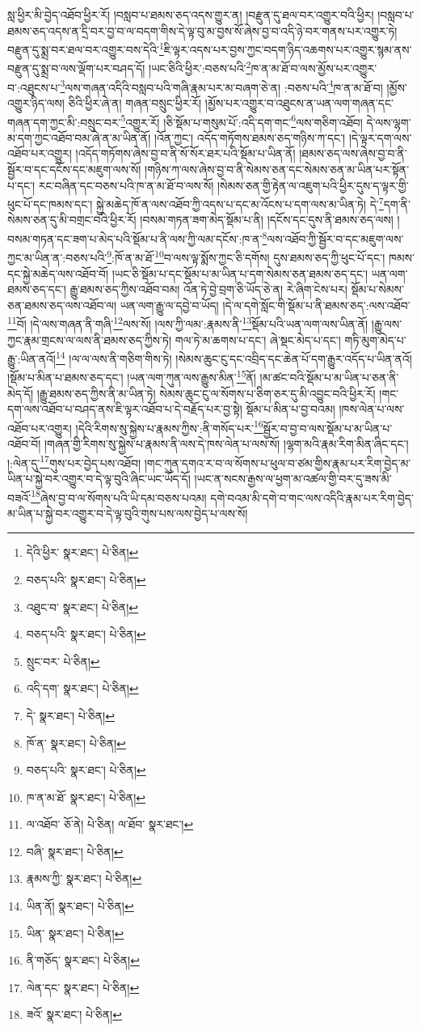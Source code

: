 སླ་ཕྱིར་མི་བྱེད་འཐོབ་ཕྱིར་རོ། །བསླབ་པ་ཐམས་ཅད་འདས་གྱུར་ན། །བརྫུན་དུ་ཐལ་བར་འགྱུར་བའི་ཕྱིར། །བསླབ་པ་ཐམས་ཅད་འདས་ན་དྲི་བར་བྱ་བ་ལ་བདག་གིས་དེ་ལྟ་བུ་མ་བྱས་སོ་ཞེས་བྱ་བ་འདི་ཉེ་བར་གནས་པར་འགྱུར་ཏེ། བརྫུན་དུ་སྨྲ་བར་ཐལ་བར་འགྱུར་བས་དེའི་\footnote{དེའི་ཕྱིར་  སྣར་ཐང་།  པེ་ཅིན། }ཇི་ལྟར་འདས་པར་བྱས་ཀྱང་བདག་ཉིད་འཆགས་པར་འགྱུར་སྙམ་ནས་བརྫུན་དུ་སྨྲ་བ་ལས་ལྡོག་པར་བཤད་དོ། །ཡང་ཅིའི་ཕྱིར་:བཅས་པའི་\footnote{བཅད་པའི་  སྣར་ཐང་།  པེ་ཅིན། }ཁ་ན་མ་ཐོ་བ་ལས་མྱོས་པར་འགྱུར་བ་:འཐུངས་པ་\footnote{འཐུང་བ་  སྣར་ཐང་།  པེ་ཅིན། }ལས་གཞན་འདིའི་བསླབ་པའི་གཞི་རྣམ་པར་མ་བཞག་ཅེ་ན། :བཅས་པའི་\footnote{བཅད་པའི་  སྣར་ཐང་།  པེ་ཅིན། }ཁ་ན་མ་ཐོ་བ། །མྱོས་འགྱུར་ཉིད་ལས། ཅིའི་ཕྱིར་ཞེ་ན། གཞན་བསྲུང་ཕྱིར་རོ། །མྱོས་པར་འགྱུར་བ་འཐུངས་ན་ཡན་ལག་གཞན་དང་གཞན་དག་ཀྱང་མི་:བསྲུང་བར་\footnote{སྲུང་བར་  པེ་ཅིན། }འགྱུར་རོ། །ཅི་སྡོམ་པ་གསུམ་པོ་:འདི་དག་གང་\footnote{འདི་དག་  སྣར་ཐང་།  པེ་ཅིན། }ལས་གཅིག་འཐོབ། དེ་ལས་ལྷག་མ་དག་ཀྱང་འཐོབ་བམ་ཞེ་ན་མ་ཡིན་ནོ། །འོན་ཀྱང་། འདོད་གཏོགས་ཐམས་ཅད་གཉིས་ཀ་དང་། །དེ་ལྟར་དག་ལས་འཐོབ་པར་འགྱུར། །འདོད་གཏོགས་ཞེས་བྱ་བ་ནི་སོ་སོར་ཐར་པའི་སྡོམ་པ་ཡིན་ནོ། །ཐམས་ཅད་ལས་ཞེས་བྱ་བ་ནི་སྦྱོར་བ་དང་དངོས་དང་མཇུག་ལས་སོ། །གཉིས་ཀ་ལས་ཞེས་བྱ་བ་ནི་སེམས་ཅན་དང་སེམས་ཅན་མ་ཡིན་པར་སྟོན་པ་དང་། རང་བཞིན་དང་བཅས་པའི་ཁ་ན་མ་ཐོ་བ་ལས་སོ། །སེམས་ཅན་གྱི་རྟེན་ལ་འཇུག་པའི་ཕྱིར་དུས་ད་ལྟར་གྱི་ཕུང་པོ་དང་ཁམས་དང་། སྐྱེ་མཆེད་ཁོ་ན་ལས་འཐོབ་ཀྱི་འདས་པ་དང་མ་འོངས་པ་དག་ལས་མ་ཡིན་ཏེ། དེ་\footnote{དེ་  སྣར་ཐང་།  པེ་ཅིན། }དག་ནི་སེམས་ཅན་དུ་མི་བགྲང་བའི་ཕྱིར་རོ། །བསམ་གཏན་ཟག་མེད་སྡོམ་པ་ནི། །དངོས་དང་དུས་ནི་ཐམས་ཅད་ལས། །བསམ་གཏན་དང་ཟག་པ་མེད་པའི་སྡོམ་པ་ནི་ལས་ཀྱི་ལམ་དངོས་:ཁ་ན་\footnote{ཁོ་ན་  སྣར་ཐང་།  པེ་ཅིན། }ལས་འཐོབ་ཀྱི་སྦྱོར་བ་དང་མཇུག་ལས་ཀྱང་མ་ཡིན་ན་:བཅས་པའི་\footnote{བཅད་པའི་  སྣར་ཐང་།  པེ་ཅིན། }:ཁོ་ན་མ་ཐོ་\footnote{ཁ་ན་མ་ཐོ་  སྣར་ཐང་།  པེ་ཅིན། }བ་ལས་ལྟ་སྨོས་ཀྱང་ཅི་དགོས། དུས་ཐམས་ཅད་ཀྱི་ཕུང་པོ་དང་། ཁམས་དང་སྐྱེ་མཆེད་ལས་འཐོབ་བོ། །ཡང་ཅི་སྡོམ་པ་དང་སྡོམ་པ་མ་ཡིན་པ་དག་སེམས་ཅན་ཐམས་ཅད་དང་། ཡན་ལག་ཐམས་ཅད་དང་། རྒྱུ་ཐམས་ཅད་ཀྱིས་འཐོབ་བམ། འོན་ཏེ་བྱེ་བྲག་ཅི་ཡོད་ཅེ་ན། རེ་ཞིག་ངེས་པར། སྡོམ་པ་སེམས་ཅན་ཐམས་ཅད་ལས་འཐོབ་ལ། ཡན་ལག་རྒྱུ་ལ་དབྱེ་བ་ཡོད། །དེ་ལ་དགེ་སློང་གི་སྡོམ་པ་ནི་ཐམས་ཅད་:ལས་འཐོབ་\footnote{ལ་འཐོབ་  ཅོ་ནེ།  པེ་ཅིན། ལ་ཐོབ་  སྣར་ཐང་། }བོ། །དེ་ལས་གཞན་ནི་གཞི་\footnote{བཞི་  སྣར་ཐང་།  པེ་ཅིན། }ལས་སོ། །ལས་ཀྱི་ལམ་:རྣམས་ནི་\footnote{རྣམས་ཀྱི་  སྣར་ཐང་།  པེ་ཅིན། }སྡོམ་པའི་ཡན་ལག་ལས་ཡིན་ནོ། །རྒྱུ་ལས་ཀྱང་རྣམ་གྲངས་ལ་ལས་ནི་ཐམས་ཅད་ཀྱིས་ཏེ། གལ་ཏེ་མ་ཆགས་པ་དང་། ཞེ་སྡང་མེད་པ་དང་། གཏི་མུག་མེད་པ་རྒྱུ་:ཡིན་ནའོ།\footnote{ཡིན་ནོ།  སྣར་ཐང་།  པེ་ཅིན། } །ལ་ལ་ལས་ནི་གཅིག་གིས་ཏེ། །སེམས་ཆུང་ངུ་དང་འབྲིད་དང་ཆེན་པོ་དག་རྒྱུར་འདོད་པ་ཡིན་ནའོ། །སྡོམ་པ་མིན་པ་ཐམས་ཅད་དང་། །ཡན་ལག་ཀུན་ལས་རྒྱུས་མིན་\footnote{ཡིན་  སྣར་ཐང་།  པེ་ཅིན། }ནོ། །མ་ཚང་བའི་སྡོམ་པ་མ་ཡིན་པ་ཅན་ནི་མེད་དོ། །རྒྱུ་ཐམས་ཅད་ཀྱིས་ནི་མ་ཡིན་ཏེ། སེམས་ཆུང་ངུ་ལ་སོགས་པ་ཅིག་ཅར་དུ་མི་འབྱུང་བའི་ཕྱིར་རོ། །གང་དག་ལས་འཐོབ་པ་བཤད་ནས་ཇི་ལྟར་འཐོབ་པ་དེ་བརྗོད་པར་བྱ་སྟེ། སྡོམ་པ་མིན་པ་བྱ་བའམ། །ཁས་ལེན་པ་ལས་འཐོབ་པར་འགྱུར། །དེའི་རིགས་སུ་སྐྱེས་པ་རྣམས་ཀྱིས་:ནི་གསོད་པར་\footnote{ནི་གཅོད་  སྣར་ཐང་།  པེ་ཅིན། }སྦྱོར་བ་བྱ་བ་ལས་སྡོམ་པ་མ་ཡིན་པ་འཐོབ་བོ། །གཞན་གྱི་རིགས་སུ་སྐྱེས་པ་རྣམས་ནི་ལས་དེ་ཁས་ལེན་པ་ལས་སོ། །ལྷག་མའི་རྣམ་རིག་མིན་ཞིང་དང་། །:ལེན་དུ་\footnote{ལེན་དང་  སྣར་ཐང་།  པེ་ཅིན། }གུས་པར་བྱེད་པས་འཐོབ། །གང་ཀུན་དགའ་ར་བ་ལ་སོགས་པ་ཕུལ་བ་ཙམ་གྱིས་རྣམ་པར་རིག་བྱེད་མ་ཡིན་པ་སྐྱེ་བར་འགྱུར་བ་དེ་ལྟ་བུའི་ཞིང་ཡང་ཡོད་དོ། །ཡང་ན་སངས་རྒྱས་ལ་ཕྱག་མ་འཚལ་གྱི་བར་དུ་ཟས་མི་བཟའོ་\footnote{ཟའོ་  སྣར་ཐང་།  པེ་ཅིན། }ཞེས་བྱ་བ་ལ་སོགས་པའི་ཡི་དམ་བཅས་པའམ། དགེ་བའམ་མི་དགེ་བ་གང་ལས་འདིའི་རྣམ་པར་རིག་བྱེད་མ་ཡིན་པ་སྐྱེ་བར་འགྱུར་བ་དེ་ལྟ་བུའི་གུས་པས་ལས་བྱེད་པ་ལས་སོ། 